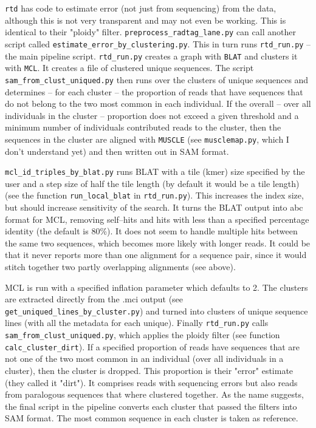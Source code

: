 \documentclass{article}\usepackage[]{graphicx}\usepackage[]{color}
\begin{document}
\texttt{rtd} has code to estimate error (not just from sequencing) from the data, although this is not very transparent and may not even be working. This is identical to their "ploidy" filter. \texttt{preprocess\_radtag\_lane.py} can call another script called \texttt{estimate\_error\_by\_clustering.py}. This in turn runs \texttt{rtd\_run.py} -- the main pipeline script. \texttt{rtd\_run.py} creates a graph with \texttt{BLAT} and clusters it with \texttt{MCL}. It creates a file of clustered unique sequences. The script \texttt{sam\_from\_clust\_uniqued.py} then runs over the clusters of unique sequences and determines -- for each cluster -- the proportion of reads that have sequences that do not belong to the two most common in each individual. If the overall -- over all individuals in the cluster -- proportion does not exceed a given threshold and a minimum number of individuals contributed reads to the cluster, then the sequences in the cluster are aligned with \texttt{MUSCLE} (see \texttt{musclemap.py}, which I don't understand yet) and then written out in SAM format.

\texttt{mcl\_id\_triples\_by\_blat.py} runs BLAT with a tile (kmer) size specified by the user and a step size of half the tile length (by default it would be a tile length) (see the function \texttt{run\_local\_blat} in \texttt{rtd\_run.py}). This increases the index size, but should increase sensitivity of the search. It turns the BLAT output into abc format for MCL, removing self--hits and hits with less than a specified percentage identity (the default is 80\%). It does not seem to handle multiple hits between the same two sequences, which becomes more likely with longer reads. It could be that it never reports more than one alignment for a sequence pair, since it would stitch together two partly overlapping alignments (see above).

MCL is run with a specified inflation parameter which defaults to 2. The clusters are extracted directly from the .mci output (see \texttt{get\_uniqued\_lines\_by\_cluster.py}) and turned into clusters of unique sequence lines (with all the metadata for each unique). Finally \texttt{rtd\_run.py} calls \texttt{sam\_from\_clust\_uniqued.py}, which applies the ploidy filter (see function \texttt{calc\_cluster\_dirt}). If a specified proportion of reads have sequences that are not one of the two most common in an individual (over all individuals in a cluster), then the cluster is dropped. This proportion is their "error" estimate (they called it "dirt"). It comprises reads with sequencing errors but also reads from paralogous sequences that where clustered together. As the name suggests, the final script in the pipeline converts each cluster that passed the filters into SAM format. The most common sequence in each cluster is taken as reference.
\end{document}

